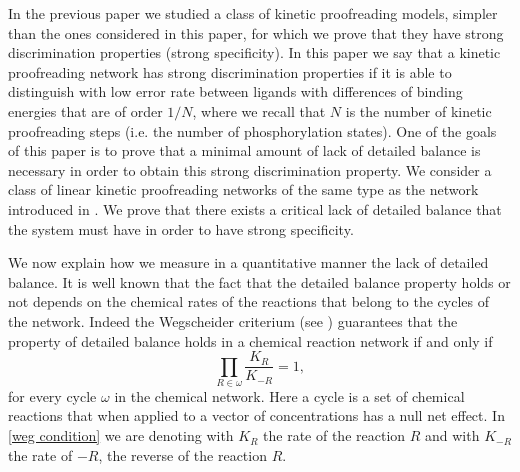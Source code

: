 \documentclass{article}
\numberwithin{equation}{section}
\theoremstyle{plain}
\begin{document}
In the previous paper \cite{franco2025stochastic} we studied a class of kinetic proofreading models, simpler than the ones considered in this paper, for which we prove that they have strong discrimination properties (strong specificity).
In this paper we say that a kinetic proofreading network has strong discrimination properties if it is able to distinguish with low error rate between ligands with differences of binding energies that are of order $1/N$, where we recall that $N $ is the number of kinetic proofreading steps (i.e. the number of phosphorylation states). 
One of the goals of this paper is to prove that a minimal amount of lack of detailed balance is necessary in order to obtain this strong discrimination property. We consider a class of linear kinetic proofreading networks of the same type as the network introduced in \cite{hopfield1974kinetic}.
We prove that there exists a critical lack of detailed balance that the system must have in order to have strong specificity.

We now explain how we measure in a quantitative manner the lack of detailed balance. 
It is well known that the fact that the detailed balance property holds or not depends on the chemical rates of the reactions that belong to the cycles of the network. Indeed the Wegscheider criterium (see \cite{wegscheider1902simultane}) guarantees that the property of detailed balance holds in a chemical reaction network if and only if 
\begin{equation} \label{weg condition}
\prod_{ R \in \omega } \frac{ K_R }{ K_{- R }} =1, 
\end{equation}
for every cycle $\omega$ in the chemical network. 
Here a cycle is a set of chemical reactions that when applied to a vector of concentrations has a null net effect. 
In \eqref{weg condition} we are denoting with $K_R $ the rate of the reaction $R$ and with $K_{-R }$ the rate of $-R$, the reverse of the reaction $R$.  
\end{document}

